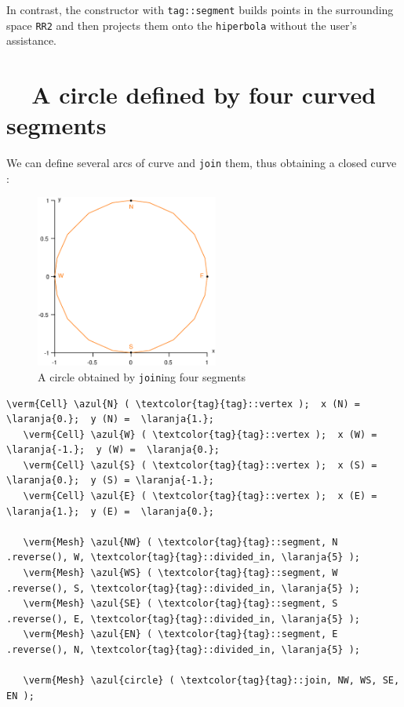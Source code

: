 \noindent In contrast, the {\small\tt{}} constructor with
{\small\tt\textcolor{tag}{tag}::segment} builds points in the surrounding space {\small\tt RR2}
and then projects them onto the {\small\tt hiperbola} without the user's assistance.


\section{~~A circle defined by four curved segments}\label{\numb section 2.\numb parag 5}

We can define several arcs of curve and {\small\tt join} them, thus obtaining a closed curve :
\medskip

\begin{figure}[ht] \centering
  \includegraphics[width=60mm]{circle}
  \caption{A circle obtained by {\small\tt join}ing four segments}
  \label{\numb section 2.\numb fig 5}
\end{figure}

\begin{Verbatim}[commandchars=\\\{\},formatcom=\small\tt,frame=single,
   label=parag-\ref{\numb section 2.\numb parag 5}.cpp,rulecolor=\color{coment},
   baselinestretch=0.94,framesep=2mm]
   \verm{Cell} \azul{N} ( \textcolor{tag}{tag}::vertex );  x (N) =  \laranja{0.};  y (N) =  \laranja{1.};
   \verm{Cell} \azul{W} ( \textcolor{tag}{tag}::vertex );  x (W) = \laranja{-1.};  y (W) =  \laranja{0.};
   \verm{Cell} \azul{S} ( \textcolor{tag}{tag}::vertex );  x (S) =  \laranja{0.};  y (S) = \laranja{-1.};
   \verm{Cell} \azul{E} ( \textcolor{tag}{tag}::vertex );  x (E) =  \laranja{1.};  y (E) =  \laranja{0.};

   \verm{Mesh} \azul{NW} ( \textcolor{tag}{tag}::segment, N .reverse(), W, \textcolor{tag}{tag}::divided_in, \laranja{5} );
   \verm{Mesh} \azul{WS} ( \textcolor{tag}{tag}::segment, W .reverse(), S, \textcolor{tag}{tag}::divided_in, \laranja{5} );
   \verm{Mesh} \azul{SE} ( \textcolor{tag}{tag}::segment, S .reverse(), E, \textcolor{tag}{tag}::divided_in, \laranja{5} );
   \verm{Mesh} \azul{EN} ( \textcolor{tag}{tag}::segment, E .reverse(), N, \textcolor{tag}{tag}::divided_in, \laranja{5} );

   \verm{Mesh} \azul{circle} ( \textcolor{tag}{tag}::join, NW, WS, SE, EN );
\end{Verbatim}

